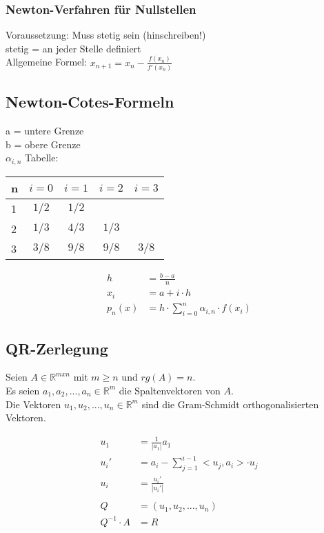\documentclass[a4paper, landscape, 10pt]{article}
\begin{document}
\begin{multicols}{5}
\begin{small}
		\subsubsection{Newton-Verfahren für Nullstellen}
			Voraussetzung: Muss stetig sein (hinschreiben!)\\
			stetig = an jeder Stelle definiert\\
			Allgemeine Formel: $x_{n+1}=x_{n}-\frac{f(x_{n})}{f'(x_{n})}$ 
	    \subsection{Newton-Cotes-Formeln}
		    
			a = untere Grenze\\
			b = obere Grenze\\
			$\alpha_{i,n}$ Tabelle:\\
			\begin{tabular}{l | c c c c }
				\noindent
				n & $i=0$ & $i=1$ & $i=2$ & $i=3$ \\\hline
				1 & $1/2$ & $1/2$ & & \\
				2 & $1/3$ & $4/3$ & $1/3$ & \\
				3 & $3/8$ & $9/8$ & $9/8$ & $3/8$
			\end{tabular}
			\begin{align*}
		        h &= \frac{b-a}{n}\\
		        x_i &= a+i\cdot h\\
		        p_{n}(x) &= h\cdot \sum_{i=0}^{n}\alpha_{i,n}\cdot f(x_{i})
			\end{align*}

		\subsection{QR-Zerlegung}
			Seien $A \in \mathbb{R}^{mxn}$ mit $m \ge n$ und $rg(A) = n$.\\
			 Es seien $a_1, a_2, ..., a_n \in \mathbb{R}^m$ die Spaltenvektoren von $A$. \\
			 Die Vektoren $u_1, u_2, ..., u_n \in \mathbb{R}^m$ sind die Gram-Schmidt orthogonalisierten Vektoren.
			 
			 \begin{align*}
			 	u_1 &= \frac{1}{|a_1|} a_1\\
			 	u_i' &= a_i - \sum_{j = 1}^{i-1} <u_j, a_i> \cdot u_j\\
			 	u_i &= \frac{u_i'}{|u_i'|}
			 	\\\\
			 	Q &= (u_1, u_2, ..., u_n)\\
			 	Q^{-1}\cdot A &= R 
			 	\end{align*}

\end{small}
\end{multicols}
\end{document}
